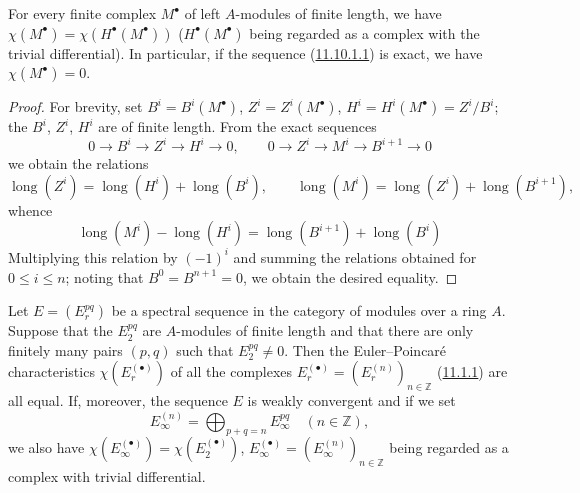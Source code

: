 \begin{proposition}[11.10.2]
\label{0.11.10.2}
For every finite complex $M^\bullet$ of left $A$-modules of finite
length, we have $\chi(M^\bullet)=\chi(H^\bullet(M^\bullet))$
($H^\bullet(M^\bullet)$ being regarded as a complex with the trivial
differential). In particular, if the sequence
\textup{(\hyperref[0.11.10.1.1]{11.10.1.1})} is exact, we have
$\chi(M^\bullet)=0$.
\end{proposition}

\begin{proof}
For brevity, set $B^i=B^i(M^\bullet)$, $Z^i=Z^i(M^\bullet)$,
$H^i=H^i(M^\bullet)=Z^i/B^i$; the $B^i$, $Z^i$, $H^i$ are of finite
length. From the exact sequences
\[
0\longrightarrow B^i\longrightarrow Z^i\longrightarrow H^i
\longrightarrow0,
\qquad
0\longrightarrow Z^i\longrightarrow M^i\longrightarrow B^{i+1}
\longrightarrow0
\]
we obtain the relations
\[
\operatorname{long}(Z^i)=\operatorname{long}(H^i)+
\operatorname{long}(B^i),
\qquad
\operatorname{long}(M^i)=\operatorname{long}(Z^i)+
\operatorname{long}(B^{i+1}),
\]
whence
\[
\operatorname{long}(M^i)-\operatorname{long}(H^i)=
\operatorname{long}(B^{i+1})+\operatorname{long}(B^i)
\]
Multiplying this relation by $(-1)^i$ and summing the relations
obtained for $0\leq i\leq n$; noting that
$B^0=B^{n+1}=0$, we obtain the desired equality.
\end{proof}

\begin{corollary}[11.10.3]
\label{0.11.10.3}
Let $E=(E_r^{pq})$ be a spectral sequence in the category of modules over a
ring $A$. Suppose that the $E_2^{pq}$ are $A$-modules of finite
length and that there are only finitely many pairs $(p,q)$ such that
$E_2^{pq}\neq0$. Then the Euler--Poincaré characteristics
$\chi(E_r^{(\bullet)})$ of all the complexes
$E_r^{(\bullet)}=(E_r^{(n)})_{n\in\mathbb Z}$
\textup{(\hyperref[0.11.1.1]{11.1.1})} are all equal. If, moreover, the sequence
$E$ is weakly convergent and if we set
\[
E_\infty^{(n)}=\bigoplus_{p+q=n}E_\infty^{pq}\quad(n\in\mathbb Z),
\]
we also have $\chi(E_\infty^{(\bullet)})=\chi(E_2^{(\bullet)})$,
$E_\infty^{(\bullet)}=(E_\infty^{(n)})_{n\in\mathbb Z}$ being regarded as
a complex with trivial differential.
\end{corollary}

